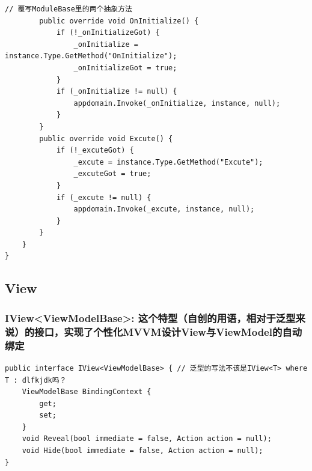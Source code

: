 \documentclass[9pt, b5paper]{article}
\begin{document}
\begin{verbatim}
// 覆写ModuleBase里的两个抽象方法
        public override void OnInitialize() {
            if (!_onInitializeGot) {
                _onInitialize = instance.Type.GetMethod("OnInitialize");
                _onInitializeGot = true;
            }
            if (_onInitialize != null) {
                appdomain.Invoke(_onInitialize, instance, null);
            }
        }
        public override void Excute() {
            if (!_excuteGot) {
                _excute = instance.Type.GetMethod("Excute");
                _excuteGot = true;
            }
            if (_excute != null) {
                appdomain.Invoke(_excute, instance, null);
            }
        }
    }
}
\end{verbatim}
\subsection{View}
\label{sec-6-4}
\subsubsection{IView<ViewModelBase>: 这个特型（自创的用语，相对于泛型来说）的接口，实现了个性化MVVM设计View与ViewModel的自动绑定}
\label{sec-6-4-1}
\begin{verbatim}
public interface IView<ViewModelBase> { // 泛型的写法不该是IView<T> where T : dlfkjdk吗？
    ViewModelBase BindingContext {
        get;
        set;
    }
    void Reveal(bool immediate = false, Action action = null);
    void Hide(bool immediate = false, Action action = null);
}
\end{verbatim}
\end{document}
